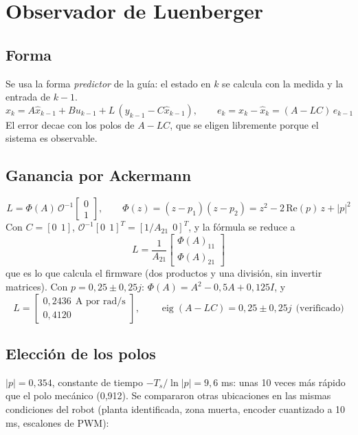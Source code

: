 \documentclass[11pt]{article}
\begin{document}
\section{Observador de Luenberger}

\subsection*{Forma}
Se usa la forma \emph{predictor} de la guía: el estado en $k$ se calcula con la medida y la entrada de $k-1$.
\begin{equation}
\hat x_k=A\hat x_{k-1}+Bu_{k-1}+L\,(y_{k-1}-C\hat x_{k-1}),\qquad e_k=x_k-\hat x_k=(A-LC)\,e_{k-1}
\end{equation}
El error decae con los polos de $A-LC$, que se eligen libremente porque el sistema es observable.

\subsection*{Ganancia por Ackermann}
\begin{equation}
L=\Phi(A)\,\mathcal O^{-1}\begin{bmatrix}0\\1\end{bmatrix},\qquad \Phi(z)=(z-p_1)(z-p_2)=z^2-2\,\mathrm{Re}(p)\,z+|p|^2
\end{equation}
Con $C=[0\ \ 1]$, $\mathcal O^{-1}[0\ \ 1]^T=[1/A_{21}\ \ 0]^T$, y la fórmula se reduce a
\begin{equation}
L=\frac{1}{A_{21}}\begin{bmatrix}\Phi(A)_{11}\\ \Phi(A)_{21}\end{bmatrix}
\end{equation}
que es lo que calcula el firmware (dos productos y una división, sin invertir matrices). Con $p=0{,}25\pm0{,}25j$: $\Phi(A)=A^2-0{,}5A+0{,}125I$, y
\[
L=\begin{bmatrix}0{,}2436\ \ \text{A por rad/s}\\ 0{,}4120\end{bmatrix},\qquad \operatorname{eig}(A-LC)=0{,}25\pm0{,}25j\ \ \text{(verificado)}
\]

\subsection*{Elección de los polos}
$|p|=0{,}354$, constante de tiempo $-T_s/\ln|p|=9{,}6$ ms: unas 10 veces más rápido que el polo mecánico (0,912). Se compararon otras ubicaciones en las mismas condiciones del robot (planta identificada, zona muerta, encoder cuantizado a 10 ms, escalones de PWM):
\end{document}
